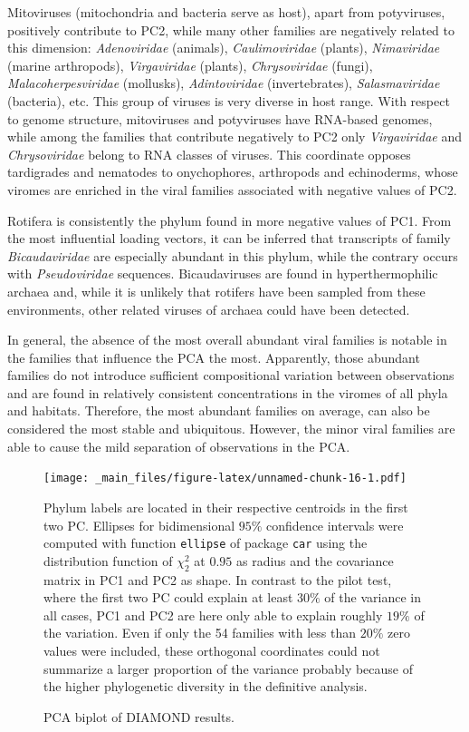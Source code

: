 \documentclass[
  openany]{book}
\begin{document}
Mitoviruses (mitochondria and bacteria serve as host), apart from potyviruses, positively contribute to PC2, while many other families are negatively related to this dimension: \emph{Adenoviridae} (animals), \emph{Caulimoviridae} (plants), \emph{Nimaviridae} (marine arthropods), \emph{Virgaviridae} (plants), \emph{Chrysoviridae} (fungi), \emph{Malacoherpesviridae} (mollusks), \emph{Adintoviridae} (invertebrates), \emph{Salasmaviridae} (bacteria), etc. This group of viruses is very diverse in host range. With respect to genome structure, mitoviruses and potyviruses have RNA-based genomes, while among the families that contribute negatively to PC2 only \emph{Virgaviridae} and \emph{Chrysoviridae} belong to RNA classes of viruses. This coordinate opposes tardigrades and nematodes to onychophores, arthropods and echinoderms, whose viromes are enriched in the viral families associated with negative values of PC2.

Rotifera is consistently the phylum found in more negative values of PC1. From the most influential loading vectors, it can be inferred that transcripts of family \emph{Bicaudaviridae} are especially abundant in this phylum, while the contrary occurs with \emph{Pseudoviridae} sequences. Bicaudaviruses are found in hyperthermophilic archaea and, while it is unlikely that rotifers have been sampled from these environments, other related viruses of archaea could have been detected.

In general, the absence of the most overall abundant viral families is notable in the families that influence the PCA the most. Apparently, those abundant families do not introduce sufficient compositional variation between observations and are found in relatively consistent concentrations in the viromes of all phyla and habitats. Therefore, the most abundant families on average, can also be considered the most stable and ubiquitous. However, the minor viral families are able to cause the mild separation of observations in the PCA.

\begin{figure}[!htbp]

\texttt{[image: \_main\_files/figure-latex/unnamed-chunk-16-1.pdf]}

\caption{PCA biplot of DIAMOND results.\label{fig:dmndbiplot}}
Phylum labels are located in their respective centroids in the first two PC. Ellipses for bidimensional $95\%$ confidence intervals were computed with function \texttt{ellipse} of package \texttt{car} using the distribution function of $\chi^2_2$ at $0.95$ as radius and the covariance matrix in PC1 and PC2 as shape. In contrast to the pilot test, where the first two PC could explain at least $30\%$ of the variance in all cases, PC1 and PC2 are here only able to explain roughly $19\%$ of the variation. Even if only the 54 families with less than $20\%$ zero values were included, these orthogonal coordinates could not summarize a larger proportion of the variance probably because of the higher phylogenetic diversity in the definitive analysis.

\end{figure}
\end{document}
